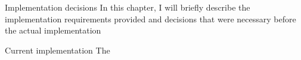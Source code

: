 \chap Implementation decisions
In this chapter, I will briefly describe the implementation requirements provided and decisions that were necessary before the actual implementation

\sec Current implementation
The {\oldRepo}